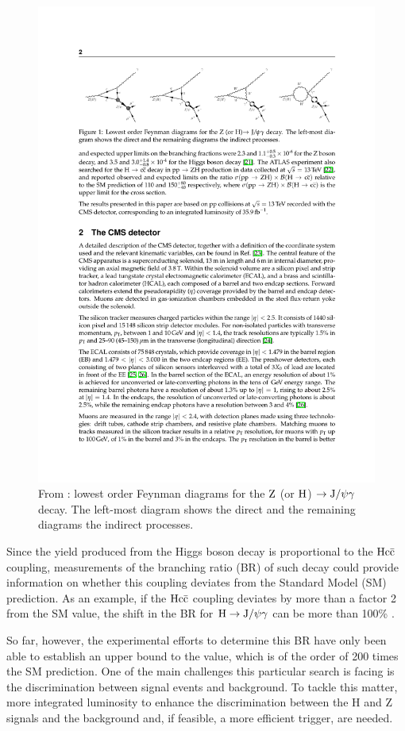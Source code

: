 \documentclass[11pt, a4paper]{article}
\renewcommand{\H}{{\rm H}}
\newcommand{\Z}{{\rm Z}}
\newcommand{\JPsi}{{\rm J}/\psi}
\begin{document}
\begin{figure}[htbp]
    \centering
    \includegraphics[width=0.9\linewidth]{images/direct_and_indirect_processes.pdf}
    \caption{From \cite{mainarticle}: lowest order Feynman diagrams for the $\Z$ (or $\H$) $\rightarrow \JPsi\gamma$ decay. The left-most diagram shows the direct and the remaining diagrams the indirect processes.
    \label{im:direct_and_indirect_processes}}
\end{figure}

Since the yield produced from the Higgs boson decay is proportional to the ${\rm Hc\bar{c}}$ coupling, measurements of the branching ratio (BR) of such decay could provide information on whether this coupling deviates from the Standard Model (SM) prediction. As an example, if the ${\rm Hc\bar{c}}$ coupling deviates by more than a factor 2 from the SM value, the shift in the BR for $\H \rightarrow \JPsi\gamma$ can be more than 100\% \cite{PhysRevD.88.053003}.

So far, however, the experimental efforts to determine this BR have only been able to establish an upper bound to the value, which is of the order of 200 times the SM prediction. One of the main challenges this particular search is facing is the discrimination between signal events and background. To tackle this matter, more integrated luminosity to enhance the discrimination between the H and Z signals and the background and, if feasible, a more efficient trigger, are needed.
\end{document}
